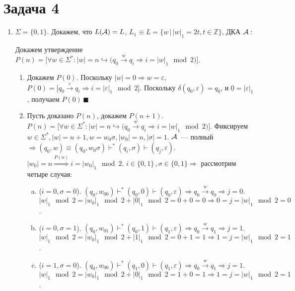 \documentclass[a4paper]{article}
\def\A{{\cal A}}
\begin{document}
\section*{Задача 4}
\begin{enumerate}
\item $\Sigma=\{0,1\}$. Докажем, что $L(\A)=L$, $L_1\equiv L=\{w\,\big|\,|w|_1=2t,t\in{\mathbb Z}\}$, ДКА $\A:$
\begin{center}
\end{center}
Докажем утверждение $P(n)=\big[\forall w\in\Sigma^*\colon |w|=n\hookrightarrow \big(q_0\overset{w}{\longrightarrow}q_i\Rightarrow i=|w|_1\mod 2\big)\big]$.
\begin{enumerate}
\item Докажем $P(0)$. Поскольку $|w|=0\Rightarrow w=\varepsilon$, $P(0)=\big[q_0\overset{\varepsilon}{\longrightarrow}q_i\Rightarrow i=|\varepsilon|_1\mod 2\big]$. Поскольку $\delta(q_0,\varepsilon)=q_{\underline{0}}$, и $\underline{0}=|\varepsilon|_1$, получаем $P(0)\,\blacksquare$
\item Пусть доказано $P(n)$, докажем $P(n+1)$. $P(n)=\big[\forall w\in\Sigma^*\colon |w|=n\hookrightarrow \big(q_0\overset{w}{\longrightarrow}q_i\Rightarrow i=|w|_1\mod 2\big)\big]$. Фиксируем $w\in\Sigma^*,|w|=n+1,w=w_0\sigma,|w_0|=n,|\sigma|=1$. $\A$~--- полный $\Rightarrow(q_0,w)\equiv(q_0,w_0\sigma)\vdash^*(q_i,\sigma)\vdash(q_j,\varepsilon)$. $|w_0|=n\overset{P(n)}{\Rightarrow}i=|w_0|_1\mod 2$. $i\in\{0,1\}\,,\sigma\in\{0,1\}\Rightarrow$ рассмотрим четыре случая:
\begin{enumerate}[a.]
\item ($i=0,\sigma=0$). $(q_0,w_00)\vdash^*(q_0,0)\vdash(q_0,\varepsilon)\Rightarrow q_0\overset{w}{\longrightarrow}q_0\Rightarrow j=0$. $|w|_1\mod 2=|w_0|_1\mod 2+|0|_1\mod 2=0+0=0\Rightarrow 0=j=|w|_1\mod 2=0$.
\item ($i=0,\sigma=1$). $(q_0,w_01)\vdash^*(q_0,1)\vdash(q_1,\varepsilon)\Rightarrow q_0\overset{w}{\longrightarrow}q_1\Rightarrow j=1$. $|w|_1\mod 2=|w_0|_1\mod 2+|1|_1\mod 2=0+1=1\Rightarrow 1=j=|w|_1\mod 2=1$.
\item ($i=1,\sigma=0$). $(q_0,w_00)\vdash^*(q_1,0)\vdash(q_1,\varepsilon)\Rightarrow q_0\overset{w}{\longrightarrow}q_1\Rightarrow j=1$. $|w|_1\mod 2=|w_0|_1\mod 2+|0|_1\mod 2=1+0=1\Rightarrow 1=j=|w|_1\mod 2=1$.

\end{enumerate}
\end{enumerate}
\end{enumerate}
\end{document}
